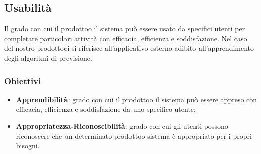     \subsection{Usabilità}
        Il grado con cui il prodotto\glosp o il sistema può essere usato da specifici utenti per completare particolari attività con efficacia, efficienza e soddisfazione. Nel caso del nostro prodotto\glosp ci si riferisce all'applicativo esterno adibito all'apprendimento degli algoritmi di previsione.
        \subsubsection{Obiettivi}
            \begin{itemize}
                \item \textbf{Apprendibilità}: grado con cui il prodotto\glosp o il sistema può essere appreso con efficacia, efficienza e soddisfazione da uno specifico utente;
                \item \textbf{Appropriatezza-Riconoscibilità}: grado con cui gli utenti possono riconoscere che un determinato prodotto\glosp o sistema è appropriato per i propri bisogni.
            \end{itemize}

